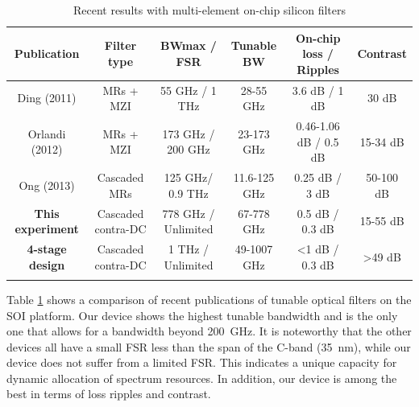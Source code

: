 \documentclass[9pt,twocolumn,twoside]{osajnl}
\begin{document}
	\begin{table}[thb]
		\caption{Recent results with multi-element on-chip silicon filters}
		\begin{tabular}{cccccc}
			\hline
			Publication & Filter type & BWmax / FSR & Tunable BW & On-chip loss / Ripples & Contrast \\
			\hline
			Ding (2011)\cite{ding2011bandwidth} &	MRs + MZI &	55 GHz / 1 THz &	28-55 GHz &	3.6 dB / 1 dB &	30 dB
			\\
			Orlandi (2012)\cite{orlandi2012reconfigurable} &	MRs + MZI &	173 GHz / 200 GHz &	23-173 GHz &	0.46-1.06 dB / 0.5 dB &	15-34 dB
			\\
			Ong (2013)\cite{ong2013ultra} &	Cascaded MRs &	125 GHz/ 0.9 THz &	11.6-125 GHz &	0.25 dB / 3 dB &	50-100 dB
			\\
			\textbf{This experiment }& Cascaded contra-DC &	778 GHz / Unlimited  &	67-778 GHz &	0.5 dB / 0.3 dB &	15-55 dB 
			\\
			\textbf{4-stage design  }& Cascaded contra-DC &	1 THz / Unlimited  &	49-1007 GHz &	<1 dB / 0.3 dB & >49 dB 
			\\
			
			\hline
			\label{table:comparison}
		\end{tabular}
	\end{table}
	
	Table \ref{table:comparison} shows a comparison of recent publications of tunable optical filters on the SOI platform. 
	Our device shows the highest tunable bandwidth and is the only one that allows for a bandwidth beyond 200~GHz. 
	It is noteworthy that the other devices all have a small FSR less than the span of the C-band (35~nm), while our device does not suffer from a limited FSR.
	This indicates a unique capacity for dynamic allocation of spectrum resources.
	In addition, our device is among the best in terms of loss ripples and contrast.
	
\end{document}
